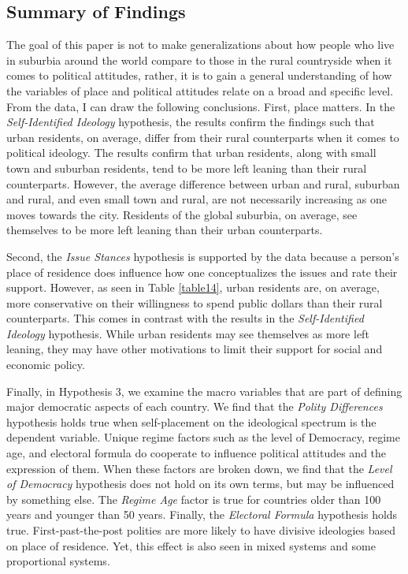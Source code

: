 \documentclass[12pt, titlepage]{article}
\newcommand\e{\emph}
\begin{document}
\subsection{Summary of Findings}

The goal of this paper is not to make generalizations about how people who live in suburbia around the world compare to those in the rural countryside when it comes to political attitudes, rather, it is to gain a general understanding of how the variables of place and political attitudes relate on a broad and specific level. From the data, I can draw the following conclusions. First, place matters. In the \e{Self-Identified Ideology} hypothesis, the results confirm the findings such that urban residents, on average, differ from their rural counterparts when it comes to political ideology. The results confirm that urban residents, along with small town and suburban residents, tend to be more left leaning than their rural counterparts. However, the average difference between urban and rural, suburban and rural, and even small town and rural, are not necessarily increasing as one moves towards the city. Residents of the global suburbia, on average, see themselves to be more left leaning than their urban counterparts.

Second, the \e{Issue Stances} hypothesis is supported by the data because a person's place of residence does influence how one conceptualizes the issues and rate their support. However, as seen in Table \ref{table14}, urban residents are, on average, more conservative on their willingness to spend public dollars than their rural counterparts. This comes in contrast with the results in the \e{Self-Identified Ideology} hypothesis. While urban residents may see themselves as more left leaning, they may have other motivations to limit their support for social and economic policy.

Finally, in Hypothesis 3, we examine the macro variables that are part of defining major democratic aspects of each country. We find that the \e{Polity Differences} hypothesis holds true when self-placement on the ideological spectrum is the dependent variable. Unique regime factors such as the level of Democracy, regime age, and electoral formula do cooperate to influence political attitudes and the expression of them. When these factors are broken down, we find that the \e{Level of Democracy} hypothesis does not hold on its own terms, but may be influenced by something else. The \e{Regime Age} factor is true for countries older than 100 years and younger than 50 years. Finally, the \e{Electoral Formula} hypothesis holds true. First-past-the-post polities are more likely to have divisive ideologies based on place of residence. Yet, this effect is also seen in mixed systems and some proportional systems.
\end{document}
